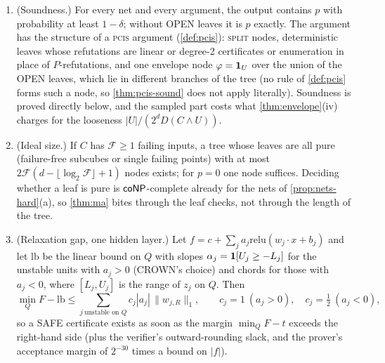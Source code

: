 \begin{proposition}\label{prop:partition}
\begin{enumerate}[label=(\alph*)]
\item (Soundness.) For every net and every argument, the output contains $p$ with
probability at least $1-\delta$; without OPEN leaves it is $p$ exactly. The argument has
the structure of a \textup{\textsc{pcis}} argument (\cref{def:pcis}):
\textup{\textsc{split}} nodes, deterministic leaves whose refutations are linear or
degree-2 certificates or enumeration in place of $P$-refutations, and one envelope node
$\varphi=\mathbf{1}_U$ over the union of the OPEN leaves, which lie in different branches of
the tree (no rule of \cref{def:pcis} forms such a node, so \cref{thm:pcis-sound} does
not apply literally). Soundness is proved directly below, and the sampled part costs
what \cref{thm:envelope}(iv) charges for the looseness $|U|/(2^dD(C\wedge U))$.
\item (Ideal size.) If $C$ has $\mathcal F\ge1$ failing inputs, a tree whose leaves are
all pure (failure-free subcubes or single failing points) with at most
$2\mathcal F(d-\lfloor\log_2\mathcal F\rfloor+1)$ nodes exists; for $p=0$ one node
suffices. Deciding whether a leaf is pure is $\mathsf{coNP}$-complete already for the nets of
\cref{prop:nets-hard}(a), so \cref{thm:ma} bites through the leaf checks, not through
the length of the tree.
\item (Relaxation gap, one hidden layer.) Let $f=c+\sum_ja_j\mathrm{relu}(w_j\cdot x+b_j)$
and let $\mathrm{lb}$ be the linear bound on $Q$ with slopes $\alpha_j=\mathbf{1}[U_j\ge-L_j]$
for the unstable units with $a_j>0$ (CROWN's choice) and chords for those with $a_j<0$,
where $[L_j,U_j]$ is the range of $z_j$ on $Q$. Then
\[
\min_QF-\mathrm{lb}\le\sum_{j\ \text{unstable on }Q}c_j|a_j|\,\|w_{j,R}\|_1,\qquad
c_j=1\ (a_j>0),\quad c_j=\tfrac12\ (a_j<0),
\]
so a SAFE certificate exists as soon as the margin $\min_QF-t$ exceeds the right-hand
side (plus the verifier's outward-rounding slack, and the prover's acceptance margin of
$2^{-30}$ times a bound on $|f|$).
\end{enumerate}
\end{proposition}

